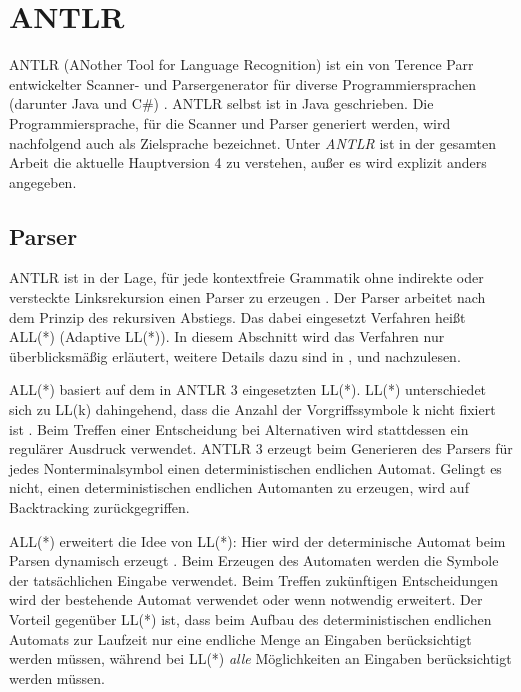 \section{ANTLR}

ANTLR (ANother Tool for Language Recognition) ist ein von Terence Parr entwickelter Scanner- und Parsergenerator für diverse Programmiersprachen (darunter Java und C\#{}) \cite{ANTLR4Reference} \cite{ANTLRWebsite}. ANTLR selbst ist in Java geschrieben. Die Programmiersprache, für die Scanner und Parser generiert werden, wird nachfolgend auch als Zielsprache bezeichnet. Unter \emph{ANTLR} ist in der gesamten Arbeit die aktuelle Hauptversion 4 zu verstehen, außer es wird explizit anders angegeben.

\subsection{Parser}

ANTLR ist in der Lage, für jede kontextfreie Grammatik ohne indirekte oder versteckte Linksrekursion einen Parser zu erzeugen \cite{ANTLRALLStar}. Der Parser arbeitet nach dem Prinzip des rekursiven Abstiegs. Das dabei eingesetzt Verfahren heißt ALL(*) (Adaptive LL(*)). In diesem Abschnitt wird das Verfahren nur überblicksmäßig erläutert, weitere Details dazu sind in \cite{ANTLR4Reference}, \cite{ANTLRLLStar} und \cite{ANTLRALLStar} nachzulesen.

ALL(*) basiert auf dem in ANTLR 3 eingesetzten LL(*). LL(*) unterschiedet sich zu LL(k) dahingehend, dass die Anzahl der Vorgriffssymbole k nicht fixiert ist \cite{ANTLRLLStar}. Beim Treffen einer Entscheidung bei Alternativen wird stattdessen ein regulärer Ausdruck verwendet. ANTLR 3 erzeugt beim Generieren des Parsers für jedes Nonterminalsymbol einen deterministischen endlichen Automat. Gelingt es nicht, einen deterministischen endlichen Automanten zu erzeugen, wird auf Backtracking zurückgegriffen.

ALL(*) erweitert die Idee von LL(*): Hier wird der determinische Automat beim Parsen dynamisch erzeugt \cite{ANTLRALLStar}. Beim Erzeugen des Automaten werden die Symbole der tatsächlichen Eingabe verwendet. Beim Treffen zukünftigen Entscheidungen wird der bestehende Automat verwendet oder wenn notwendig erweitert. Der Vorteil gegenüber LL(*) ist, dass beim Aufbau des deterministischen endlichen Automats zur Laufzeit nur eine endliche Menge an Eingaben berücksichtigt werden müssen, während bei LL(*) \emph{alle} Möglichkeiten an Eingaben berücksichtigt werden müssen.

